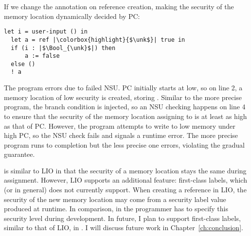 {If we change the annotation on reference creation, making the security of the
memory location dynamically decided by PC:

\noindent
{}
\begin{lstlisting}[style=tt,basicstyle=\ttfamily\footnotesize]
  let i = user-input () in
  let a = ref |\colorbox{highlight}{$\unk$}| true in
  if (i : |$\Bool_{\unk}$|) then
      a := false
  else ()
  ! a
\end{lstlisting}

\noindent The  program errors due to failed NSU. PC
initially starts at low, so on line 2, a memory location of low security is
created, storing \true. Similar to the more precise program, the branch
condition is injected, so an NSU checking happens on line 4 to ensure that the
security of the memory location assigning to is at least as high as that of PC.
However, the program attempts to write to low memory under high PC, so the NSU
check fails and signals a runtime error. The more precise program runs to
completion but the less precise one errors, violating the gradual guarantee.

\DynIFC is similar to LIO in that the security of a memory location stays the
same during assignment. However, LIO supports an additional feature: first-class
labels, which \DynIFC (or \Surface in general) does not currently support. When
creating a reference in LIO, the security of the new memory location may come
from a security label value produced at runtime. In comparison, in \Surface the
programmer has to specify this security level during development. In future, I
plan to support first-class labels, similar to that of LIO, in \Surface. I will
discuss future work in Chapter~\ref{ch:conclusion}.

}  %
